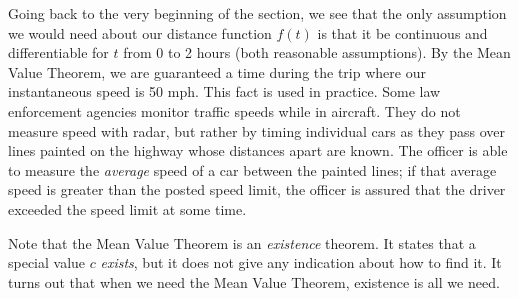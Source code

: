 Going back to the very beginning of the section, we see that the only assumption we would need about our distance function $f(t)$ is that it be continuous and differentiable for $t$ from 0 to 2 hours (both reasonable assumptions).  By the Mean Value Theorem, we are guaranteed a time during the trip where our instantaneous speed is 50 mph. This fact is used in practice. Some law enforcement agencies monitor traffic speeds while in aircraft. They do not measure speed with radar, but rather by timing individual cars as they pass over lines painted on the highway whose distances apart are known. The officer is able to measure the \emph{average} speed of a car between the painted lines; if that average speed is greater than the posted speed limit, the officer is assured that the driver exceeded the speed limit at some time.

Note that the Mean Value Theorem is an \emph{existence} theorem. It states that a special value $c$ \emph{exists}, but it does not give any indication about how to find it. It turns out that when we need the Mean Value Theorem, existence is all we need.


